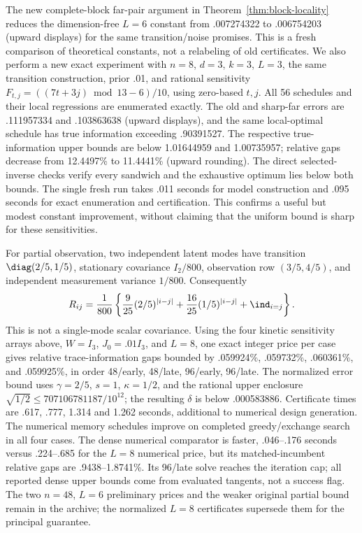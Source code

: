 The new complete-block far-pair argument in Theorem~\ref{thm:block-locality}
reduces the dimension-free $L=6$ constant from .007274322 to .006754203
(upward displays) for the same transition/noise promises. This is a fresh
comparison of theoretical constants, not a relabeling of old certificates.
We also perform a new exact experiment with $n=8$, $d=3$, $k=3$, $L=3$,
the same transition construction, prior .01, and rational sensitivity
$F_{t,j}=((7t+3j)\bmod13-6)/10$, using zero-based $t,j$.
All 56 schedules and their local regressions are enumerated exactly. The
old and sharp-far errors are .111957334 and .103863638 (upward displays),
and the same local-optimal schedule has true information exceeding .90391527.
The respective true-information upper bounds are below 1.01644959 and
1.00735957; relative gaps decrease from 12.4497\% to 11.4441\% (upward
rounding). The direct selected-inverse checks verify every sandwich and the
exhaustive optimum lies below both bounds. The single fresh run takes .011
seconds for model construction and .095 seconds for exact enumeration and
certification. This confirms a useful but modest constant improvement,
without claiming that the uniform bound is sharp for these sensitivities.

For partial observation, two independent latent modes have transition
$\diag(2/5,1/5)$, stationary covariance $I_2/800$, observation row
$(3/5,4/5)$, and independent measurement variance $1/800$. Consequently
\begin{equation}\label{eq:two-mode-probe}
 R_{ij}=\frac1{800}\left\{
   \frac9{25}(2/5)^{|i-j|}+\frac{16}{25}(1/5)^{|i-j|}+\ind_{i=j}\right\}.
\end{equation}
This is not a single-mode scalar covariance. Using the four kinetic
sensitivity arrays above, $W=I_3$, $J_0=.01I_3$, and $L=8$, one exact
integer price per case gives relative trace-information gaps bounded by
.059924\%, .059732\%, .060361\%, and .059925\%, in order
48/early, 48/late, 96/early, 96/late. The normalized error bound uses
$\gamma=2/5$, $s=1$, $\kappa=1/2$, and the rational upper enclosure
$\sqrt{1/2}\le707106781187/10^{12}$; the resulting $\delta$ is below
.000583886. Certificate times are .617, .777, 1.314 and 1.262 seconds,
additional to numerical design generation.
The numerical memory schedules improve on completed greedy/exchange search
in all four cases. The dense numerical comparator is faster, .046--.176
seconds versus .224--.685 for the $L=8$ numerical price, but its matched-incumbent
relative gaps are .9438--1.8741\%. Its 96/late solve reaches the iteration cap;
all reported dense upper bounds come from evaluated tangents, not a success
flag. The two $n=48$, $L=6$ preliminary prices and the weaker original partial
bound remain in the archive; the normalized $L=8$ certificates supersede them
for the principal guarantee.

